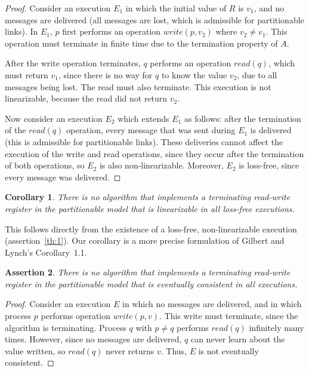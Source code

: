 \documentclass[a4paper,twocolumn,10pt]{article}
\newtheorem{theorem}{Assertion}
\newtheorem{corollary}[theorem]{Corollary}
\begin{document}
\begin{proof}
Consider an execution $E_1$ in which the initial value of $R$ is $v_1$, and no messages are
delivered (all messages are lost, which is admissible for partitionable links). In $E_1$, $p$ first
performs an operation $\mathit{write}(p, v_2)$ where $v_2 \neq v_1$. This operation must terminate
in finite time due to the termination property of $A$.

After the write operation terminates, $q$ performs an operation $\mathit{read}(q)$, which must
return $v_1$, since there is no way for $q$ to know the value $v_2$, due to all messages being lost.
The read must also terminate. This execution is not linearizable, because the read did not return
$v_2$.

Now consider an execution $E_2$ which extends $E_1$ as follows: after the termination of the
$\mathit{read}(q)$ operation, every message that was sent during $E_1$ is delivered (this is
admissible for partitionable links). These deliveries cannot affect the execution of the write and
read operations, since they occur after the termination of both operations, so $E_2$ is also
non-linearizable. Moreover, $E_2$ is loss-free, since every message was delivered.
\end{proof}

\begin{corollary}\label{corr:2}
There is no algorithm that implements a terminating read-write register in the partitionable model
that is linearizable in all loss-free executions.
\end{corollary}

This follows directly from the existence of a loss-free, non-linearizable execution
(assertion~\ref{th:1}). Our corollary is a more precise formulation of Gilbert and Lynch's
Corollary~1.1.

\begin{theorem}\label{th:3}
There is no algorithm that implements a terminating read-write register in the partitionable model
that is eventually consistent in all executions.
\end{theorem}

\begin{proof}
Consider an execution $E$ in which no messages are delivered, and in which process $p$ performs
operation $\mathit{write}(p, v)$. This write must terminate, since the algorithm is terminating.
Process $q$ with $p \neq q$ performs $\mathit{read}(q)$ infinitely many times. However, since no
messages are delivered, $q$ can never learn about the value written, so $\mathit{read}(q)$ never
returns $v$. Thus, $E$ is not eventually consistent.
\end{proof}
\end{document}
